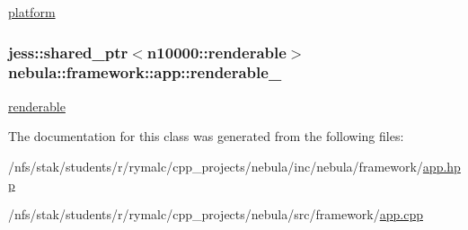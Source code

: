 \hyperlink{namespacenebula_1_1platform}{platform} \hypertarget{classnebula_1_1framework_1_1app_ae316f80ddb05de0580af8a0b4d9fcb57}{
\subsubsection[{renderable\_\-}]{\setlength{\rightskip}{0pt plus 5cm}jess::shared\_\-ptr$<${\bf n10000::renderable}$>$ {\bf nebula::framework::app::renderable\_\-}}}
\label{classnebula_1_1framework_1_1app_ae316f80ddb05de0580af8a0b4d9fcb57}


\hyperlink{classnebula_1_1framework_1_1renderable}{renderable} 

The documentation for this class was generated from the following files:\begin{DoxyCompactItemize}
\item 
/nfs/stak/students/r/rymalc/cpp\_\-projects/nebula/inc/nebula/framework/\hyperlink{inc_2nebula_2framework_2app_8hpp}{app.hpp}\item 
/nfs/stak/students/r/rymalc/cpp\_\-projects/nebula/src/framework/\hyperlink{src_2framework_2app_8cpp}{app.cpp}\end{DoxyCompactItemize}
